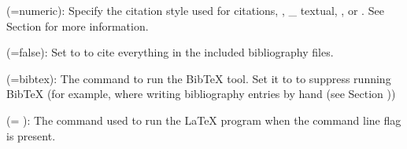\documentclass{book}
\begin{document}
\begin{mdUl}[class={list-star,loose},data-line={2155}]
\begin{mdLi}[data-line={2204}]
\end{mdLi}%
\begin{mdLi}[data-line={2209}]%
\begin{mdP}[data-line={2209}]%
{}%
{} (=numeric): Specify the citation style used for citations,
{}%
{}, %
{}\_%
{}textual, %
{}%
{}, or %
{}%
{}. See Section%
{}{\mdNbsp}%
{} for more 
  information.%
\end{mdP}%
\end{mdLi}%
\begin{mdLi}[data-line={2213}]%
\begin{mdP}[data-line={2213}]%
{}%
{} (=false): Set to %
{}%
{} to cite everything in the included bibliography files.%
\end{mdP}%
\end{mdLi}%
\begin{mdLi}[data-line={2215}]%
\begin{mdP}[data-line={2215}]%
{}%
{} (=bibtex): The command to run the BibTeX tool. Set it to %
{}%
{} to suppress
  running BibTeX (for example, where writing bibliography entries by hand 
  (see Section%
{}{\mdNbsp}%
{}))%
\end{mdP}%
\end{mdLi}%
\begin{mdLi}[data-line={2219}]%
\begin{mdP}[data-line={2219}]%
{}%
{} (=%
{}%
{}): The command used to run the LaTeX program when the %
{}%
{}
  command line flag is present. 
{} %
{}%
\end{mdP}%

\end{mdLi}
\end{mdUl}
\end{document}
